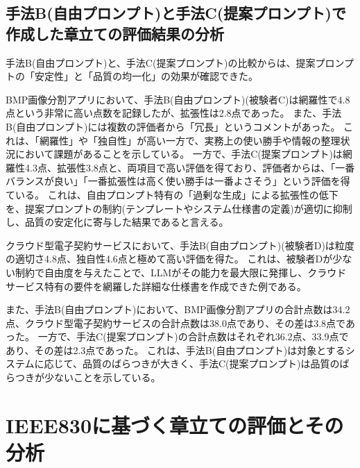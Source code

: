 
\subsection{手法B(自由プロンプト)と手法C(提案プロンプト)で作成した章立ての評価結果の分析}
手法B(自由プロンプト)と、手法C(提案プロンプト)の比較からは、提案プロンプトの「安定性」と「品質の均一化」の効果が確認できた。

BMP画像分割アプリにおいて、手法B(自由プロンプト)(被験者C)は網羅性で4.8点という非常に高い点数を記録したが、拡張性は2.8点であった。
また、手法B(自由プロンプト)には複数の評価者から「冗長」というコメントがあった。
これは、「網羅性」や「独自性」が高い一方で、実務上の使い勝手や情報の整理状況において課題があることを示している。
一方で、手法C(提案プロンプト)は網羅性4.3点、拡張性3.8点と、両項目で高い評価を得ており、評価者からは、「一番バランスが良い」「一番拡張性は高く使い勝手は一番よさそう」という評価を得ている。
これは、自由プロンプト特有の「過剰な生成」による拡張性の低下を、提案プロンプトの制約(テンプレートやシステム仕様書の定義)が適切に抑制し、品質の安定化に寄与した結果であると言える。

クラウド型電子契約サービスにおいて、手法B(自由プロンプト)(被験者D)は粒度の適切さ4.8点、独自性4.6点と極めて高い評価を得た。
これは、被験者Dが少ない制約で自由度を与えたことで、LLMがその能力を最大限に発揮し、クラウドサービス特有の要件を網羅した詳細な仕様書を作成できた例である。

また、手法B(自由プロンプト)において、BMP画像分割アプリの合計点数は34.2点、クラウド型電子契約サービスの合計点数は38.0点であり、その差は3.8点であった。
一方で、手法C(提案プロンプト)の合計点数はそれぞれ36.2点、33.9点であり、その差は2.3点であった。
これは、手法B(自由プロンプト)は対象とするシステムに応じて、品質のばらつきが大きく、手法C(提案プロンプト)は品質のばらつきが少ないことを示している。


\section{IEEE830に基づく章立ての評価とその分析}

